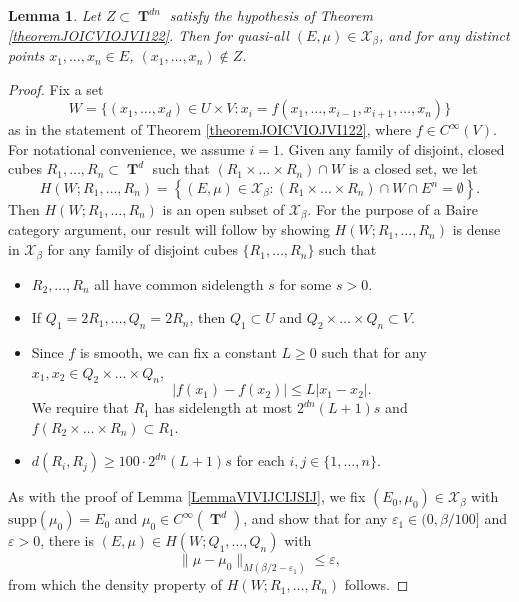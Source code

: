\documentclass[12pt,reqno]{article}
\numberwithin{equation}{section}
\DeclareMathOperator{\TT}{\mathbf{T}}
\newtheorem{lemma}[theorem]{Lemma}
\numberwithin{theorem}{section}
\begin{document}
\begin{lemma}
    Let $Z \subset \TT^{dn}$ satisfy the hypothesis of Theorem \ref{theoremJOICVIOJVI122}. Then for quasi-all $(E,\mu) \in \mathcal{X}_\beta$, and for any distinct points $x_1,\dots,x_n \in E$, $(x_1,\dots,x_n) \not \in Z$.
\end{lemma}
\begin{proof}
    Fix a set
    \[ W = \{ (x_1,\dots,x_d) \in U \times V : x_i = f(x_1,\dots,x_{i-1},x_{i+1},\dots,x_n) \} \]
    as in the statement of Theorem \ref{theoremJOICVIOJVI122}, where $f \in C^\infty(V)$. For notational convenience, we assume $i = 1$. Given any family of disjoint, closed cubes $R_1,\dots,R_n \subset \TT^d$ such that $(R_1 \times \dots \times R_n) \cap W$ is a closed set, we let
    \begin{equation}
        H(W;R_1,\dots,R_n) = \left\{ (E,\mu) \in \mathcal{X}_\beta: (R_1 \times \dots \times R_n) \cap W \cap E^n = \emptyset \right\}.
    \end{equation}
    Then $H(W;R_1,\dots,R_n)$ is an open subset of $\mathcal{X}_\beta$. For the purpose of a Baire category argument, our result will follow by showing $H(W;R_1,\dots,R_n)$ is dense in $\mathcal{X}_\beta$ for any family of disjoint cubes $\{ R_1,\dots, R_n \}$ such that
    \begin{itemize}
        \item $R_2,\dots,R_n$ all have common sidelength $s$ for some $s > 0$.
        \item If $Q_1 = 2R_1,\dots,Q_n = 2R_n$, then $Q_1 \subset U$ and $Q_2 \times \dots \times Q_n \subset V$.
        \item Since $f$ is smooth, we can fix a constant $L \geq 0$ such that for any $x_1,x_2 \in Q_2 \times \dots \times Q_n$,
        \[ |f(x_1) - f(x_2)| \leq L|x_1 - x_2|. \]
        We require that $R_1$ has sidelength at most $2^{dn}(L+1) s$ and $f(R_2 \times \dots \times R_n) \subset R_1$.
        \item $d(R_i,R_j) \geq 100 \cdot 2^{dn} (L+1) s$ for each $i,j \in \{ 1, \dots, n \}$.
    \end{itemize}
    As with the proof of Lemma \ref{LemmaVIVIJCIJSIJ}, we fix $(E_0,\mu_0) \in \mathcal{X}_\beta$ with $\text{supp}(\mu_0) = E_0$ and $\mu_0 \in C^\infty(\TT^d)$, and show that for any $\varepsilon_1 \in (0,\beta/100]$ and $\varepsilon > 0$, there is $(E,\mu) \in H(W;Q_1,\dots,Q_n)$ with
    \[ \| \mu - \mu_0 \|_{M(\beta/2-\varepsilon_1)} \leq \varepsilon, \]
    from which the density property of $H(W;R_1,\dots,R_n)$ follows.


\end{proof}
\end{document}
